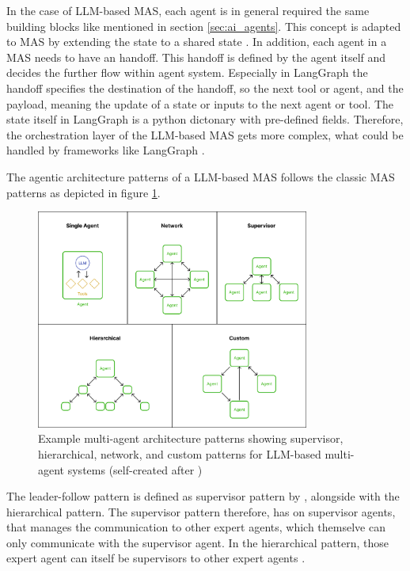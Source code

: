\documentclass[a4paper,oneside,bibliography=totoc]{scrbook}
\begin{document}
In the case of \ac{LLM}-based \ac{MAS}, each agent is in general required the same building blocks like mentioned in section \ref{sec:ai_agents}. This concept is adapted to \ac{MAS} by extending the state to a shared state \cite{Sapkota2025}. In addition, each agent in a \ac{MAS} needs to have an handoff. This handoff is defined by the agent itself and decides the further flow within agent system. Especially in LangGraph the handoff specifies the destination of the handoff, so the next tool or agent, and the payload, meaning the update of a state or inputs to the next agent or tool. The state itself in LangGraph is a python dictonary with pre-defined fields. Therefore, the orchestration layer of the \ac{LLM}-based \ac{MAS} gets more complex, what could be handled by frameworks like LangGraph \cite{LangChain2025b}.

The agentic architecture patterns of a \ac{LLM}-based \ac{MAS} follows the classic \ac{MAS} patterns as depicted in figure \ref{fig:mas_architecture}.

\begin{figure}[t]
  \centering
  \includegraphics[width=0.8\textwidth]{figures/Multi-agent architectures.png}
  \caption[Example multi-agent architecture patterns showing supervisor, hierarchical, network, and custom patterns for LLM-based multi-agent systems]{Example multi-agent architecture patterns showing supervisor, hierarchical, network, and custom patterns for LLM-based multi-agent systems (self-created after \cite{LangChain2025b})}
  \label{fig:mas_architecture}
\end{figure}

The leader-follow pattern is defined as supervisor pattern by \citet{LangChain2025b}, alongside with the hierarchical pattern. The supervisor pattern therefore, has on supervisor agents, that manages the communication to other expert agents, which themselve can only communicate with the supervisor agent. In the hierarchical pattern, those expert agent can itself be supervisors to other expert agents \cite{LangChain2025b}.
\end{document}
